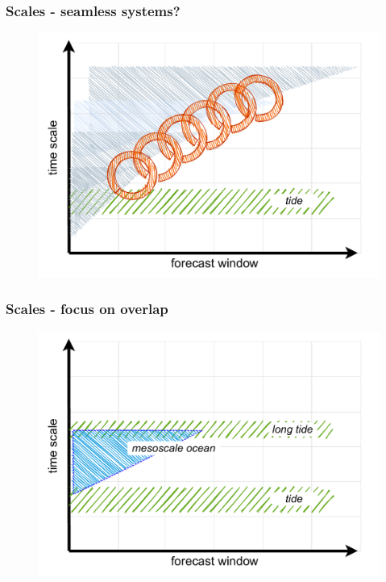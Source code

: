 \begin{frame}
\frametitle{Scales - seamless systems? }
    \begin{figure}      
     \includegraphics[height=0.8\textheight]{figures/diagrams/scales_with_chain.pdf}
    \end{figure} 
\end{frame}
\begin{frame}
\frametitle{Scales - focus on overlap}
    \begin{figure}      
     \includegraphics[height=0.8\textheight]{figures/diagrams/scales_focus.pdf}
    \end{figure} 
\end{frame}
